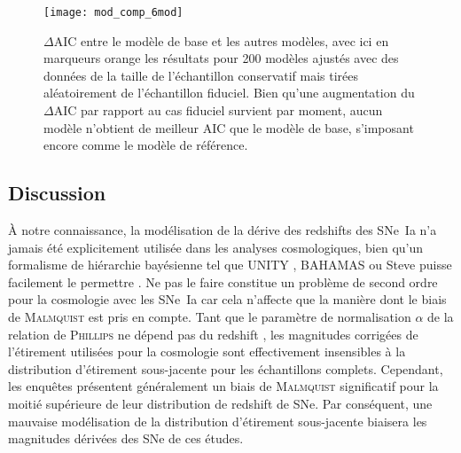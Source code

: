 \documentclass[../main/main.tex]{subfiles}
\begin{document}
\begin{SCfigure}[0.8][ht!]
    \texttt{[image: mod\_comp\_6mod]}
    \caption[$\Delta$AIC pour des échantillons de taille conservative tirés
    aléatoirement de l'échantillon fiduciel]{$\Delta$AIC entre le modèle de
        base et les autres modèles, avec ici en marqueurs orange les
        résultats pour 200 modèles ajustés avec des données de la taille de
        l'échantillon conservatif mais tirées aléatoirement de l'échantillon
        fiduciel. Bien qu'une augmentation du $\Delta$AIC par rapport au cas
        fiduciel survient par moment, aucun modèle n'obtient de meilleur AIC
        que le modèle de base, s'imposant encore comme le modèle de
    référence.}
    \label{fig:mod_comp_cal}
\end{SCfigure}

\subsection{Discussion}\label{ssec:disc}

À notre connaissance, la modélisation de la dérive des redshifts des SNe~Ia n'a
jamais été explicitement utilisée dans les analyses cosmologiques, bien qu'un
formalisme de hiérarchie bayésienne tel que UNITY \citep{rubin2015}, BAHAMAS
\citep{shariff2016} ou Steve \citep{hinton2019} puisse facilement le permettre
\citep[voir, par exemple, les sections 1.3 et 2.5 de][]{rubin2015}. Ne pas le
faire constitue un problème de second ordre pour la cosmologie avec les SNe~Ia
car cela n'affecte que la manière dont le biais de \textsc{Malmquist} est pris
en compte. Tant que le paramètre de normalisation $\alpha$ de la relation de
\textsc{Phillips} \citep{phillips1993} ne dépend pas du redshift \citep[une
étude qui dépasse le cadre de cette thèse, mais voir, par
exemple][]{scolnic2018}, les magnitudes corrigées de l'étirement utilisées pour
la cosmologie sont effectivement insensibles à la distribution d'étirement
sous-jacente pour les échantillons complets. Cependant, les enquêtes présentent
généralement un biais de \textsc{Malmquist} significatif pour la moitié
supérieure de leur distribution de redshift de SNe. Par conséquent, une mauvaise
modélisation de la distribution d'étirement sous-jacente biaisera les magnitudes
dérivées des SNe de ces études.
\end{document}

